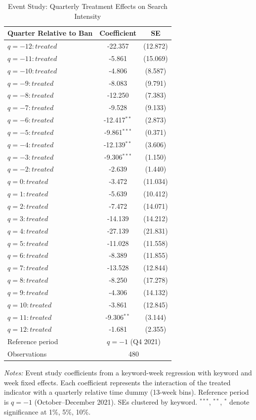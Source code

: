 \begin{table}[htbp]
\centering
\caption{Event Study: Quarterly Treatment Effects on Search Intensity}
\label{tab:event_study}
\begin{threeparttable}
\begin{tabular}{lcc}
\toprule
Quarter Relative to Ban & Coefficient & SE \\
\midrule
$q = -12:treated$ & -22.357 & (12.872) \\
$q = -11:treated$ & -5.861 & (15.069) \\
$q = -10:treated$ & -4.806 & (8.587) \\
$q = -9:treated$ & -8.083 & (9.791) \\
$q = -8:treated$ & -12.250 & (7.383) \\
$q = -7:treated$ & -9.528 & (9.133) \\
$q = -6:treated$ & -12.417$^{**}$ & (2.873) \\
$q = -5:treated$ & -9.861$^{***}$ & (0.371) \\
$q = -4:treated$ & -12.139$^{**}$ & (3.606) \\
$q = -3:treated$ & -9.306$^{***}$ & (1.150) \\
$q = -2:treated$ & -2.639 & (1.440) \\
$q = 0:treated$ & -3.472 & (11.034) \\
$q = 1:treated$ & -5.639 & (10.412) \\
$q = 2:treated$ & -7.472 & (14.071) \\
$q = 3:treated$ & -14.139 & (14.212) \\
$q = 4:treated$ & -27.139 & (21.831) \\
$q = 5:treated$ & -11.028 & (11.558) \\
$q = 6:treated$ & -8.389 & (11.855) \\
$q = 7:treated$ & -13.528 & (12.844) \\
$q = 8:treated$ & -8.250 & (17.278) \\
$q = 9:treated$ & -4.306 & (14.132) \\
$q = 10:treated$ & -3.861 & (12.845) \\
$q = 11:treated$ & -9.306$^{**}$ & (3.144) \\
$q = 12:treated$ & -1.681 & (2.355) \\
\midrule
Reference period & \multicolumn{2}{c}{$q = -1$ (Q4 2021)} \\
Observations & \multicolumn{2}{c}{480} \\
\bottomrule
\end{tabular}
\begin{tablenotes}[flushleft]
\small
\item \textit{Notes:} Event study coefficients from a keyword-week regression with keyword and week fixed effects. Each coefficient represents the interaction of the treated indicator with a quarterly relative time dummy (13-week bins). Reference period is $q = -1$ (October--December 2021). SEs clustered by keyword. $^{***}$, $^{**}$, $^{*}$ denote significance at 1\%, 5\%, 10\%.
\end{tablenotes}
\end{threeparttable}
\end{table}
